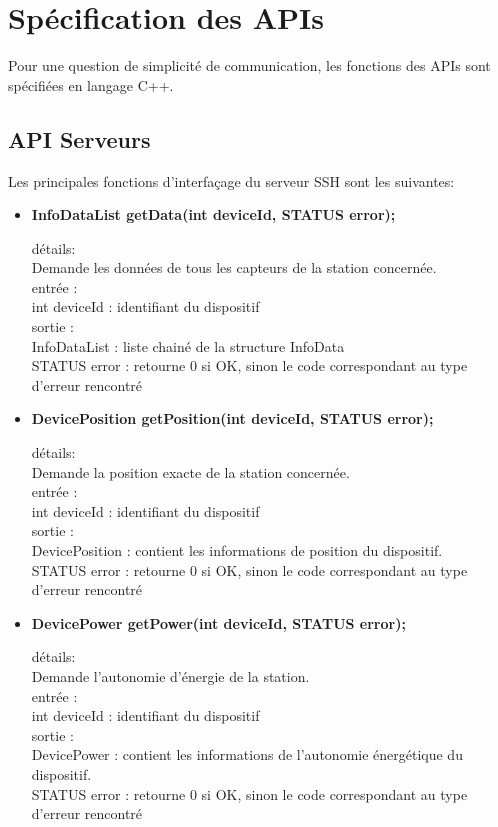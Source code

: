 \section{Spécification des APIs}

Pour une question de simplicité de communication, les fonctions des APIs sont 
spécifiées en langage C++.

\subsection{API Serveurs}
Les principales fonctions d'interfaçage du serveur SSH sont les suivantes:

\begin{itemize}
\item \textbf{InfoDataList getData(int deviceId, STATUS error);}
\begin{tabbing}
détails: \=\\
\>Demande les données de tous les capteurs de la station concernée. \\
entrée :  \\
\>int deviceId : identifiant du dispositif \\
sortie : \\
\>InfoDataList : liste chainé de la structure InfoData \\
\>STATUS error : retourne 0 si OK, sinon le code correspondant au type d'erreur rencontré \\
\end{tabbing}

\item \textbf{DevicePosition getPosition(int deviceId, STATUS error);}
\begin{tabbing}
détails: \=\\
\>Demande la position exacte de la station concernée. \\
entrée : \\
\>int deviceId : identifiant du dispositif \\
sortie : \\
\>DevicePosition : contient les informations de position du dispositif. \\
\>STATUS error : retourne 0 si OK, sinon le code correspondant au type d'erreur rencontré \\
\end{tabbing}


\item \textbf{DevicePower getPower(int deviceId, STATUS error);}
\begin{tabbing}
détails: \=\\
\>		Demande l’autonomie d'énergie de la station. \\
entrée : \\
\>		int deviceId : identifiant du dispositif \\
sortie : \\
\>		DevicePower : contient les informations de l’autonomie énergétique du dispositif. \\
\>		STATUS error : retourne 0 si OK, sinon le code correspondant au type d'erreur rencontré \\
\end{tabbing}


\end{itemize}
